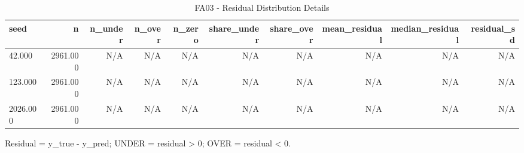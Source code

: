 \begin{table}[h!]
\centering
\caption{FA03 - Residual Distribution Details}
\label{tab:fa03\_-\_residual\_distribution\_details}
\begin{tabular}{lrrrrrrrrr}
\toprule
seed & n & n\_under & n\_over & n\_zero & share\_under & share\_over & mean\_residual & median\_residual & residual\_sd \\
\midrule
42.000 & 2961.000 & N/A & N/A & N/A & N/A & N/A & N/A & N/A & N/A \\
123.000 & 2961.000 & N/A & N/A & N/A & N/A & N/A & N/A & N/A & N/A \\
2026.000 & 2961.000 & N/A & N/A & N/A & N/A & N/A & N/A & N/A & N/A \\
\bottomrule
\end{tabular}
\vspace{4pt}
\footnotesize{Residual = y\_true - y\_pred; UNDER = residual \textgreater{} 0; OVER = residual \textless{} 0.}\\
\end{table}
